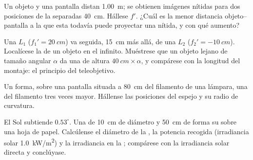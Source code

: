 \begin{exercise}[$\star\star$]\label{exo:b1:mirrors-thin-lenses:9}
Un objeto y una pantalla distan \qty{1.00}{m}; se obtienen imágenes
nítidas para dos posiciones de la  separadas \qty{40}{cm}. Hállese
$f'$. ¿Cuál es la menor distancia objeto--pantalla a la que esta 
todavía puede proyectar una  nítida, y con qué aumento?
\end{exercise}

\begin{exercise}[$\star\star\star$]\label{exo:b1:mirrors-thin-lenses:10}
Una  $L_1$ ($f_1' = \qty{20}{cm}$) va seguida, \qty{15}{cm}
más allá, de una  $L_2$ ($f_2' = \qty{-10}{cm}$).
Localícese la  de un objeto en el infinito. Muéstrese que un objeto
lejano de tamaño angular $\alpha$ da una  de altura
$\qty{40}{cm}\times\alpha$, y compárese con la longitud del montaje: el
principio del teleobjetivo.
\end{exercise}

\begin{exercise}[$\star\star\star$]\label{exo:b1:mirrors-thin-lenses:11}
Un  forma, sobre una pantalla situada a \qty{80}{cm} del
filamento de una lámpara, una  del filamento tres veces mayor.
Hállense las posiciones del espejo y su radio de curvatura.
\end{exercise}

\begin{exercise}[$\star\star\star$]\label{exo:b1:mirrors-thin-lenses:12}
El Sol subtiende $0.53^\circ$. Una  de \qty{10}{cm} de
diámetro y \qty{50}{cm} de  forma su  sobre una hoja
de papel. Calcúlense el diámetro de la , la potencia recogida
(irradiancia solar \qty{1.0}{kW/m^2}) y la irradiancia en la ;
compárese con la irradiancia solar directa y conclúyase.
\end{exercise}

